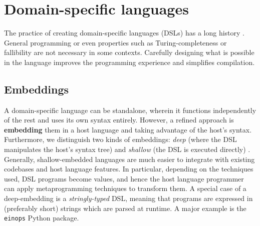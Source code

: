 




\section{Domain-specific languages}

The practice of creating domain-specific languages (DSLs) has a long history \cite{hudak1996building}. General programming or even properties such as Turing-completeness or fallibility are not necessary in some contexts. Carefully designing what is possible in the language improves the programming experience and simplifies compilation. 

\subsection{Embeddings}

A domain-specific language can be standalone, wherein it functions independently of the rest and uses its own syntax entirely. However, a refined approach is \textbf{embedding} them in a host language and taking advantage of the host's syntax. Furthermore, we distinguish two kinds of embeddings: \textit{deep} (where the DSL manipulates the host's syntax tree) and \textit{shallow} (the DSL is executed directly) \cite{gibbons2014folding}. 
Generally, shallow-embedded languages are much easier to integrate with existing codebases and host language features. In particular, depending on the techniques used, DSL programs become values, and hence the host language programmer can apply metaprogramming techniques to transform them. 
A special case of a deep-embedding is a \textit{stringly-typed} DSL, meaning that programs are expressed in (preferably short) strings which are parsed at runtime. A major example is the \texttt{einops} Python package.

